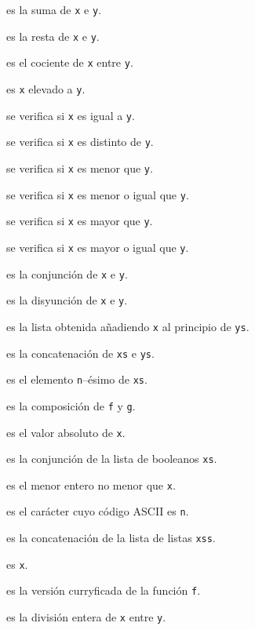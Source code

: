 \begin{enumerate*}
\item {} es la suma de \verb|x| e \verb|y|.
\item {} es la resta de \verb|x| e \verb|y|.
\item {} es el cociente de \verb|x| entre \verb|y|.
\item {} es \verb|x| elevado a \verb|y|.
\item {} se verifica si \verb|x| es igual a \verb|y|.
\item {} se verifica si \verb|x| es distinto de \verb|y|.
\item {} se verifica si \verb|x| es menor que \verb|y|.
\item {} se verifica si \verb|x| es menor o igual que \verb|y|.
\item {} se verifica si \verb|x| es mayor que \verb|y|.
\item {} se verifica si \verb|x| es mayor o igual que \verb|y|.
\item {} es la conjunción de \verb|x| e \verb|y|.
\item {} es la disyunción de \verb|x| e \verb|y|.
\item {} es la lista obtenida añadiendo \verb|x| al principio de
  \verb|ys|. 
\item {} es la concatenación de \verb|xs| e \verb|ys|.
\item {} es el elemento \verb|n|--ésimo de \verb|xs|.
\item {} es la composición de \verb|f| y \verb|g|.
\item {} es el valor absoluto de \verb|x|.
\item {} es la conjunción de la lista de booleanos \verb|xs|.
\item {} es el menor entero no menor que \verb|x|.
\item {} es el carácter cuyo código ASCII es \verb|n|.
\item {} es la concatenación de la lista de listas \verb|xss|.
\item {} es \verb|x|.
\item {} es la versión curryficada de la función \verb|f|.
\item {} es la división entera de \verb|x| entre \verb|y|.

\end{enumerate*}
